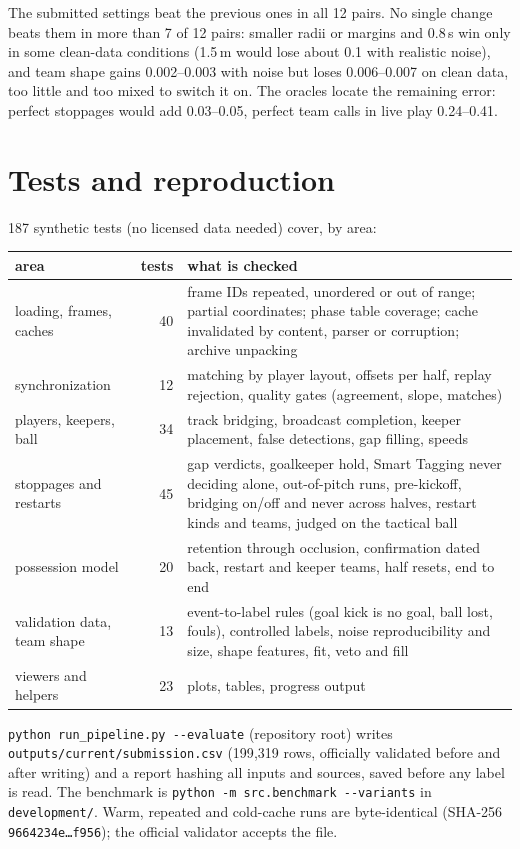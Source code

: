 \documentclass[10pt,a4paper]{article}
\begin{document}
The submitted settings beat the previous ones in all 12 pairs. No single change beats them in more than 7 of 12 pairs: smaller
radii or margins and 0.8\,s win only in some clean-data conditions (1.5\,m would lose about 0.1 with realistic noise), and team
shape gains 0.002--0.003 with noise but loses 0.006--0.007 on clean data, too little and too mixed to switch it on. The oracles locate the remaining error: perfect stoppages would add 0.03--0.05, perfect team calls in
live play 0.24--0.41.

\section{Tests and reproduction}
187 synthetic tests (no licensed data needed) cover, by area:
\begin{center}\small\vspace{-4pt}
\begin{tabularx}{\linewidth}{@{}lrY@{}}
\toprule
area & tests & what is checked \\
\midrule
loading, frames, caches & 40 & frame IDs repeated, unordered or out of range; partial coordinates; phase table coverage; cache invalidated by content, parser or corruption; archive unpacking \\
synchronization & 12 & matching by player layout, offsets per half, replay rejection, quality gates (agreement, slope, matches) \\
players, keepers, ball & 34 & track bridging, broadcast completion, keeper placement, false detections, gap filling, speeds \\
stoppages and restarts & 45 & gap verdicts, goalkeeper hold, Smart Tagging never deciding alone, out-of-pitch runs, pre-kickoff, bridging on/off and never across halves, restart kinds and teams, judged on the tactical ball \\
possession model & 20 & retention through occlusion, confirmation dated back, restart and keeper teams, half resets, end to end \\
validation data, team shape & 13 & event-to-label rules (goal kick is no goal, ball lost, fouls), controlled labels, noise reproducibility and size, shape features, fit, veto and fill \\
viewers and helpers & 23 & plots, tables, progress output \\
\bottomrule
\end{tabularx}\vspace{-4pt}
\end{center}
\texttt{python run\_pipeline.py -{}-evaluate} (repository root) writes \texttt{outputs/current/submission.csv} (199{,}319 rows,
officially validated before and after writing) and a report hashing all inputs and sources, saved before any label is read.
The benchmark is \texttt{python -m src.benchmark -{}-variants} in \texttt{development/}. Warm, repeated and cold-cache runs
are byte-identical (SHA-256 \texttt{9664234e\ldots f956}); the official validator accepts the file.
\end{document}
